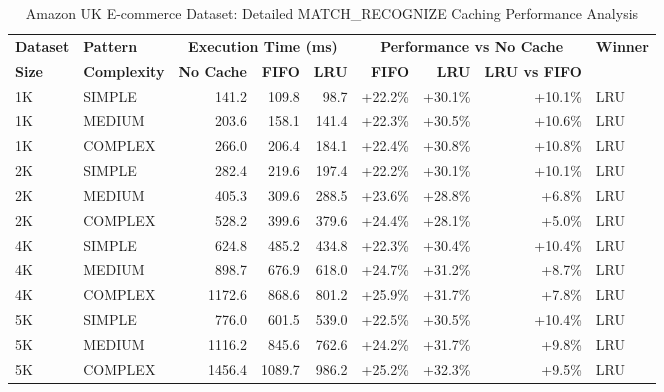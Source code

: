 \documentclass{article}
\begin{document}
\begin{table}[htbp]
\centering
\caption{Amazon UK E-commerce Dataset: Detailed MATCH\_RECOGNIZE Caching Performance Analysis}
\label{tab:amazon_detailed_performance}
\begin{tabular}{|l|l|r|r|r|r|r|r|l|}
\hline
\textbf{Dataset} & \textbf{Pattern} & \multicolumn{3}{c|}{\textbf{Execution Time (ms)}} & \multicolumn{3}{c|}{\textbf{Performance vs No Cache}} & \textbf{Winner} \\
\textbf{Size} & \textbf{Complexity} & \textbf{No Cache} & \textbf{FIFO} & \textbf{LRU} & \textbf{FIFO} & \textbf{LRU} & \textbf{LRU vs FIFO} & \\
\hline
1K & SIMPLE & 141.2 & 109.8 & 98.7 & +22.2\% & +30.1\% & +10.1\% & LRU \\
1K & MEDIUM & 203.6 & 158.1 & 141.4 & +22.3\% & +30.5\% & +10.6\% & LRU \\
1K & COMPLEX & 266.0 & 206.4 & 184.1 & +22.4\% & +30.8\% & +10.8\% & LRU \\
2K & SIMPLE & 282.4 & 219.6 & 197.4 & +22.2\% & +30.1\% & +10.1\% & LRU \\
2K & MEDIUM & 405.3 & 309.6 & 288.5 & +23.6\% & +28.8\% & +6.8\% & LRU \\
2K & COMPLEX & 528.2 & 399.6 & 379.6 & +24.4\% & +28.1\% & +5.0\% & LRU \\
4K & SIMPLE & 624.8 & 485.2 & 434.8 & +22.3\% & +30.4\% & +10.4\% & LRU \\
4K & MEDIUM & 898.7 & 676.9 & 618.0 & +24.7\% & +31.2\% & +8.7\% & LRU \\
4K & COMPLEX & 1172.6 & 868.6 & 801.2 & +25.9\% & +31.7\% & +7.8\% & LRU \\
5K & SIMPLE & 776.0 & 601.5 & 539.0 & +22.5\% & +30.5\% & +10.4\% & LRU \\
5K & MEDIUM & 1116.2 & 845.6 & 762.6 & +24.2\% & +31.7\% & +9.8\% & LRU \\
5K & COMPLEX & 1456.4 & 1089.7 & 986.2 & +25.2\% & +32.3\% & +9.5\% & LRU \\
\hline
\end{tabular}
\end{table}
\end{document}
